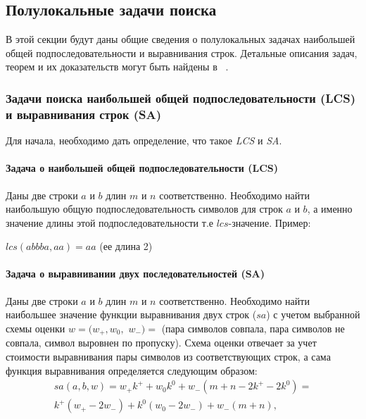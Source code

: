 

\subsection{Полулокальные задачи поиска}

В этой секции будут даны общие сведения о полулокальных задачах наибольшей общей подпоследовательности и выравнивания строк.
Детальные описания задач, теорем и их доказательств могут быть найдены в ~\cite{alex2007semilocal}.

\subsubsection{Задачи поиска наибольшей общей подпоследовательности (LCS) и выравнивания строк (SA)}

Для начала, необходимо дать определение, что такое \emph{LCS} и \emph{SA}.

\paragraph*{Задача о наибольшей общей подпоследовательности (LCS)}\mbox{}

Даны две строки $a$ и $b$ длин $m$ и $n$ соответственно.
Необходимо найти наибольшую общую подпоследовательность
 символов для строк $a$ и $b$, а именно значение длины этой подпоследовательности т.е $lcs$-значение.
Пример:
\begin{center}
    $lcs(abbba,aa)=aa$ (ее длина 2)
\end{center}
 
\paragraph*{Задача о выравнивании двух последовательностей (SA)}\mbox{}

Даны две строки $a$ и $b$ длин $m$ и $n$ соответственно.
Необходимо найти наибольшее  значение функции выравнивания двух строк ($sa$) с учетом выбранной схемы оценки $w = (w_{+}, w_{0} ,$ $w_{-})=$ (пара символов совпала, пара символов не совпала, символ выровнен по пропуску).
Схема оценки отвечает за учет стоимости выравнивания пары символов из соответствующих строк, а сама функция выравнивания определяется следующим образом:
\begin{equation}\label{formula:sa}
\begin{aligned}
    sa(a,b,w) = w_{+}k^{+} + w_{0}k^{0} + w_{-} (m + n - 2k^{+} - 2k^{0}) =\\
    k^{+} (w_{+} - 2w_{-} ) + k^{0}  (w_{0} - 2w_{-}) + w_{-}(m + n),
\end{aligned}
\end{equation}


